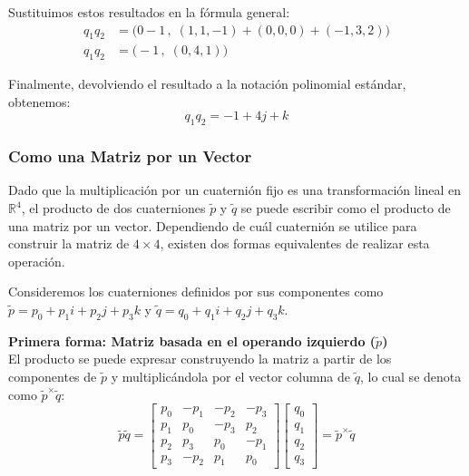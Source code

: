 Sustituimos estos resultados en la fórmula general:
\begin{align*}
    q_1 q_2 &= \big( 0 - 1 \, , \; (1, 1, -1) + (0, 0, 0) + (-1, 3, 2) \big) \\
    q_1 q_2 &= \big( -1 \, , \; (0, 4, 1) \big)
\end{align*}

Finalmente, devolviendo el resultado a la notación polinomial estándar, obtenemos:
\begin{equation*}
    q_1 q_2 = -1 + 4j + k
\end{equation*}

\subsubsection{Como una Matriz por un Vector}
Dado que la multiplicación por un cuaternión fijo es una transformación lineal en $\mathbb{R}^4$, el producto de dos cuaterniones $\tilde{p}$ y $\tilde{q}$ se puede escribir como el producto de una matriz por un vector. Dependiendo de cuál cuaternión se utilice para construir la matriz de $4 \times 4$, existen dos formas equivalentes de realizar esta operación.

Consideremos los cuaterniones definidos por sus componentes como $\tilde{p} = p_0 + p_1i + p_2j + p_3k$ y $\tilde{q} = q_0 + q_1i + q_2j + q_3k$.

\textbf{Primera forma: Matriz basada en el operando izquierdo ($\tilde{p}$)} \\
El producto se puede expresar construyendo la matriz a partir de los componentes de $\tilde{p}$ y multiplicándola por el vector columna de $\tilde{q}$, lo cual se denota como $\tilde{p}^{\times}\tilde{q}$:
\begin{equation}
    \tilde{p}\tilde{q} = 
    \begin{bmatrix}
        p_0 & -p_1 & -p_2 & -p_3 \\
        p_1 &  p_0 & -p_3 &  p_2 \\
        p_2 &  p_3 &  p_0 & -p_1 \\
        p_3 & -p_2 &  p_1 &  p_0
    \end{bmatrix}
    \begin{bmatrix}
        q_0 \\ q_1 \\ q_2 \\ q_3
    \end{bmatrix}
    = \tilde{p}^{\times}\tilde{q}
\end{equation}

